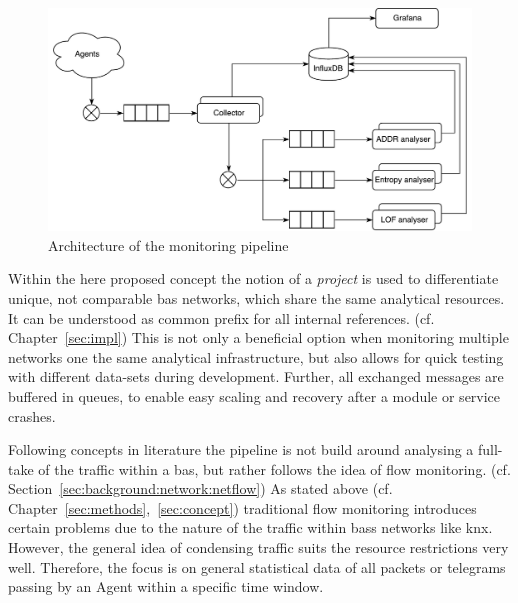 \begin{figure}[h]
	\centering
	\includegraphics[width=\textwidth]{figures/300-concept-architecture.pdf}
	\caption[Pipeline Architecture]{Architecture of the monitoring pipeline  }
	\label{fig:concept:architecture}
\end{figure}

Within the here proposed concept the notion of a \emph{project} is used to differentiate unique, not comparable \gls{bas} networks, which share the same analytical resources. It can be understood as common prefix for all internal references. (cf. Chapter~\ref{sec:impl})
This is not only a beneficial option when monitoring multiple networks one the same analytical infrastructure, but also allows for quick testing with different data-sets during development.
Further, all exchanged messages are buffered in queues, to enable easy scaling and recovery after a module or service crashes.

Following concepts in literature \parencite[][]{Celeda2012,Pan2014} the pipeline is not build around analysing a full-take of the traffic within a \gls{bas}, but rather follows the idea of flow monitoring. (cf. Section~\ref{sec:background:network:netflow})
As stated above (cf. Chapter~\ref{sec:methods},~\ref{sec:concept}) traditional flow monitoring introduces certain problems due to the nature of the traffic within \glspl{bas} networks like \gls{knx}. However, the general idea of condensing traffic suits the resource restrictions very well.
Therefore, the focus is on general statistical data of all packets or telegrams passing by an Agent within a specific time window.


